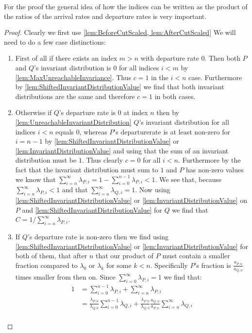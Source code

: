 For the proof the general idea of how the indices can be written as the product of the ratios of
the arrival rates and departure rates is very important.
\begin{proof}
  Clearly we first use \ref{lem:BeforeCutScaled, lem:AfterCutScaled}
  We will need to do a few case distinctions:
  \begin{enumerate}
    \item First of all if there exists an index $m > n$ with departure rate $0$. Then
    both $P$ and $Q$'s invariant distribution is $0$ for all indices $i < m$ by \ref{lem:MaxUnreachableInvariance}. Thus $c = 1$ in the $i < n$ case.
    Furthermore by \ref{lem:ShiftedInvariantDistributionValue} we find that both invariant distributions
    are the same and therefore $c = 1$ in both cases.
    \item Otherwise if $Q$'s departure rate is $0$ at index $n$ then by \ref{lem:UnreachableInvariantDistribution} $Q$'s invariant distribution
    for all indices $i < n$ equals $0$, whereas $P$'s departurerate is at least non-zero for $i = n-1$ by
    \ref{lem:ShiftedInvariantDistributionValue} or \ref{lem:InvariantDistributionValue} and using that
    the sum of an invariant distribution must be $1$. Thus clearly $c=0$ for all $i < n$. Furthermore
    by the fact that the invariant distribution must sum to $1$ and $P$ has non-zero values we know that
    $\sum_{i=n}^\infty \lambda_{P,i} = 1 - \sum_{i=0}^{n-1}\lambda_{P,i} < 1$. We see that, because
    $\sum_{i=n}^\infty \lambda_{P,i} < 1$ and that $\sum_{i=n}^\infty \lambda_{Q,i} = 1$.
    Now using \ref{lem:ShiftedInvariantDistributionValue} or \ref{lem:InvariantDistributionValue}
    on $P$ and \ref{lem:ShiftedInvariantDistributionValue} for $Q$ we find that $C = 1/\sum_{i=n}^\infty \lambda_{P,i}$.
    \item If $Q$'s departure rate is non-zero then we find using \ref{lem:ShiftedInvariantDistributionValue} or \ref{lem:InvariantDistributionValue}
    for both of them, that after $n$ that our product of $P$ must contain a smaller fraction compared to $\lambda_0$
    or $\lambda_k$ for some $k < n$. Specifically $P$'s fraction is $\frac{a_{P,n}}{a_{Q,n}}$ times smaller from then on.
    Since $\sum_{i=0}^\infty \lambda_{P,i} = 1$ we find that:
    \begin{align}
      1 &= \sum_{i=0}^{n-1} \lambda_{P,i} + \sum_{i=n}^{\infty} \lambda_{P,i} \nonumber\\
        &= \frac{\lambda_{P,0}}{\lambda_{Q,0}} \sum_{i=0}^{n-1} \lambda_{Q,i}  + \frac{\lambda_{P,0}}{\lambda_{Q,0}}\frac{a_{Q,n}}{a_{P,n}}\sum_{i=n}^{\infty} \lambda_{Q,i} \nonumber\\

\end{align}
\end{enumerate}
\end{proof}

